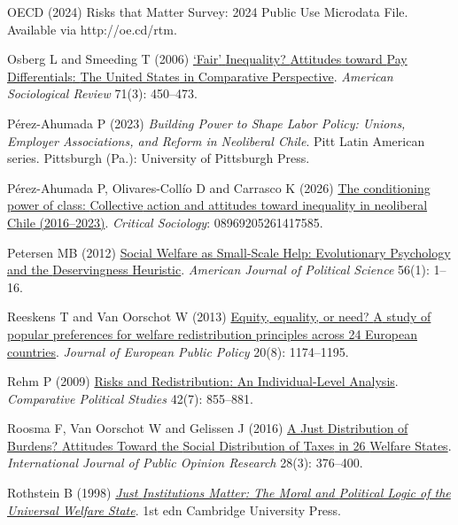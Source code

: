 \documentclass[
  12pt,
]{article}
\newlength{\cslhangindent}
\newenvironment{CSLReferences}[2] %
 {\begin{list}{}{%
  \setlength{\itemindent}{0pt}
  \setlength{\leftmargin}{0pt}
  \setlength{\parsep}{0pt}
  \ifodd #1
   \setlength{\leftmargin}{\cslhangindent}
   \setlength{\itemindent}{-1\cslhangindent}
  \fi
  \setlength{\itemsep}{#2\baselineskip}}}
 {\end{list}}
\begin{document}
\begin{CSLReferences}{1}{1}
OECD (2024) Risks that {Matter Survey}: 2024 {Public Use Microdata
File}. {Available} via {http://oe.cd/rtm}.

Osberg L and Smeeding T (2006)
\href{https://doi.org/10.1177/000312240607100305}{{`{Fair}'}
{Inequality}? {Attitudes} toward {Pay Differentials}: {The United
States} in {Comparative Perspective}}. \emph{American Sociological
Review} 71(3): 450--473.

Pérez-Ahumada P (2023) \emph{Building Power to Shape Labor Policy:
Unions, Employer Associations, and Reform in Neoliberal {Chile}}. Pitt
{Latin American} series. Pittsburgh (Pa.): University of Pittsburgh
Press.

Pérez-Ahumada P, Olivares-Collío D and Carrasco K (2026)
\href{https://doi.org/10.1177/08969205261417585}{The conditioning power
of class: {Collective} action and attitudes toward inequality in
neoliberal {Chile} (2016--2023)}. \emph{Critical Sociology}:
08969205261417585.

Petersen MB (2012)
\href{https://doi.org/10.1111/j.1540-5907.2011.00545.x}{Social {Welfare}
as {Small}-{Scale Help}: {Evolutionary Psychology} and the
{Deservingness Heuristic}}. \emph{American Journal of Political Science}
56(1): 1--16.

Reeskens T and Van Oorschot W (2013)
\href{https://doi.org/10.1080/13501763.2012.752064}{Equity, equality, or
need? {A} study of popular preferences for welfare redistribution
principles across 24 {European} countries}. \emph{Journal of European
Public Policy} 20(8): 1174--1195.

Rehm P (2009) \href{https://doi.org/10.1177/0010414008330595}{Risks and
{Redistribution}: {An Individual-Level Analysis}}. \emph{Comparative
Political Studies} 42(7): 855--881.

Roosma F, Van Oorschot W and Gelissen J (2016)
\href{https://doi.org/10.1093/ijpor/edv020}{A {Just Distribution} of
{Burdens}? {Attitudes Toward} the {Social Distribution} of {Taxes} in 26
{Welfare States}}. \emph{International Journal of Public Opinion
Research} 28(3): 376--400.

Rothstein B (1998)
\emph{\href{https://doi.org/10.1017/CBO9780511598449}{Just {Institutions
Matter}: {The Moral} and {Political Logic} of the {Universal Welfare
State}}}. 1st edn Cambridge University Press.


\end{CSLReferences}
\end{document}
